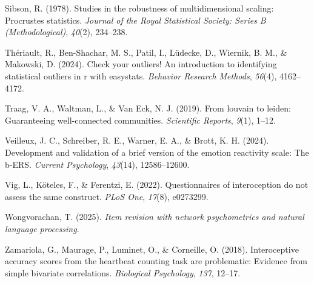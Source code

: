 \documentclass[
  man,
  floatsintext,
  longtable,
  nolmodern,
  notxfonts,
  notimes,
  mask,
  colorlinks=true,linkcolor=blue,citecolor=blue,urlcolor=blue]{apa7}
\newlength{\cslhangindent}
\newenvironment{CSLReferences}[2] %
 {\begin{list}{}{%
  \setlength{\itemindent}{0pt}
  \setlength{\leftmargin}{0pt}
  \setlength{\parsep}{0pt}
  \ifodd #1
   \setlength{\leftmargin}{\cslhangindent}
   \setlength{\itemindent}{-1\cslhangindent}
  \fi
  \setlength{\itemsep}{#2\baselineskip}}}
 {\end{list}}
\begin{document}
\begin{CSLReferences}{1}{0}
Sibson, R. (1978). Studies in the robustness of multidimensional
scaling: Procrustes statistics. \emph{Journal of the Royal Statistical
Society: Series B (Methodological)}, \emph{40}(2), 234--238.

Thériault, R., Ben-Shachar, M. S., Patil, I., Lüdecke, D., Wiernik, B.
M., \& Makowski, D. (2024). Check your outliers! An introduction to
identifying statistical outliers in r with easystats. \emph{Behavior
Research Methods}, \emph{56}(4), 4162--4172.

Traag, V. A., Waltman, L., \& Van Eck, N. J. (2019). From louvain to
leiden: Guaranteeing well-connected communities. \emph{Scientific
Reports}, \emph{9}(1), 1--12.

Veilleux, J. C., Schreiber, R. E., Warner, E. A., \& Brott, K. H.
(2024). Development and validation of a brief version of the emotion
reactivity scale: The b-ERS. \emph{Current Psychology}, \emph{43}(14),
12586--12600.

Vig, L., Köteles, F., \& Ferentzi, E. (2022). Questionnaires of
interoception do not assess the same construct. \emph{PLoS One},
\emph{17}(8), e0273299.

Wongvorachan, T. (2025). \emph{Item revision with network psychometrics
and natural language processing}.

Zamariola, G., Maurage, P., Luminet, O., \& Corneille, O. (2018).
Interoceptive accuracy scores from the heartbeat counting task are
problematic: Evidence from simple bivariate correlations.
\emph{Biological Psychology}, \emph{137}, 12--17.

\end{CSLReferences}
\end{document}
